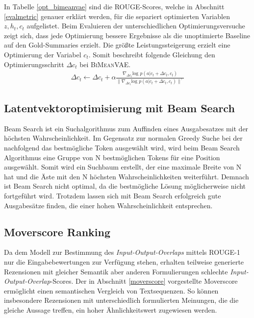 In Tabelle \ref{opt_bimeanvae} sind die ROUGE-Scores, welche in Abschnitt \ref*{evalmetric} genauer erklärt werden, für die separiert optimierten Variablen $z, h_t, c_t$ aufgelistet.
Beim Evaluieren der unterschiedlichen Optimierungsversuche zeigt sich, dass jede Optimierung bessere Ergebnisse als die unoptimierte Baseline auf den Gold-Summaries erzielt.
Die größte Leistungssteigerung erzielt eine Optimierung der Variabel $c_t$.
Somit beschreibt folgende Gleichung den Optimierungsschritt $\Delta c_t$ bei \textsc{BiMeanVAE}.
\begin{align*}
    \Delta c_t \leftarrow \Delta c_t + \alpha \frac{\nabla_{\Delta c_t} \text{log }p(a|c_t+\Delta c_t,c_t)}{\| \nabla_{\Delta c_t} \text{log }p(a|c_t +\Delta c_t ,c_t )\|^\gamma}
\end{align*}




\subsection{Latentvektoroptimisierung mit Beam Search}
Beam Search ist ein Suchalgorithmus zum Auffinden eines Ausgabesatzes mit der höchsten Wahrscheinlichkeit. 
Im Gegensatz zur normalen Greedy Suche bei der nachfolgend das bestmögliche Token ausgewählt wird, wird beim Beam Search Algorithmus eine Gruppe von N bestmöglichen Tokens für eine Position ausgewählt. 
Somit wird ein Suchbaum erstellt, der eine maximale Breite von N hat und die Äste mit den N höchsten Wahrscheinlichkeiten weiterführt. 
Demnach ist Beam Search nicht optimal, da die bestmögliche Lösung möglicherweise nicht fortgeführt wird. Trotzdem lassen sich mit Beam Search erfolgreich gute Ausgabesätze finden, die einer hohen Wahrscheinlichkeit entsprechen.

\subsection{Moverscore Ranking}
\label{moverscore_ranking}
Da dem Modell zur Bestimmung des \textit{Input-Output-Overlaps} mittels ROUGE-1 nur die Eingabebewertungen zur Verfügung stehen, erhalten teilweise generierte Rezensionen mit gleicher Semantik aber anderen Formulierungen schlechte  \textit{Input-Output-Overlap}-Scores.
Der in Abschnitt \ref{moverscore} vorgestellte Moverscore ermöglicht einen semantischen Vergleich von Textsequenzen. 
So können insbesondere Rezensionen mit unterschiedlich formulierten Meinungen, die die gleiche Aussage treffen, ein hoher Ähnlichkeitswert zugewiesen werden.

